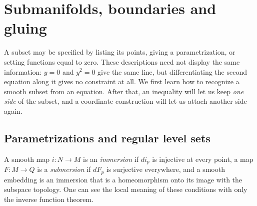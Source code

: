 \chapter{Submanifolds, boundaries and gluing}\label{f:submanifolds}
A subset may be specified by listing its points, giving a parametrization, or setting functions equal to zero. These descriptions need not display the same information: $y=0$ and $y^2=0$ give the same line, but differentiating the second equation along it gives no constraint at all. We first learn how to recognize a smooth subset from an equation. After that, an inequality will let us keep \emph{one side} of the subset, and a coordinate construction will let us attach another side again.

\section{Parametrizations and regular level sets}
A smooth map $i:N\to M$ is an \emph{immersion} if $di_p$ is injective at every point, a map $F:M\to Q$ is a \emph{submersion} if $dF_p$ is surjective everywhere, and a smooth embedding is an immersion that is a homeomorphism onto its image with the subspace topology. One can see the local meaning of these conditions with only the inverse function theorem.

